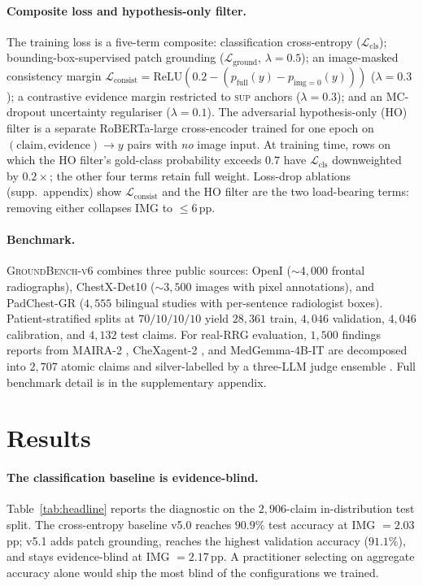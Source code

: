 \documentclass{article}
\begin{document}
\paragraph{Composite loss and hypothesis-only filter.} The training
loss is a five-term composite: classification cross-entropy
($\mathcal{L}_{\mathrm{cls}}$); bounding-box-supervised patch
grounding ($\mathcal{L}_{\mathrm{ground}}$, $\lambda = 0.5$); an
image-masked consistency margin
$\mathcal{L}_{\mathrm{consist}} = \mathrm{ReLU}(0.2 - (p_{\mathrm{full}}(y)
- p_{\mathrm{img}=0}(y)))$ ($\lambda = 0.3$); a contrastive evidence
margin restricted to \textsc{sup} anchors ($\lambda = 0.3$); and an
MC-dropout uncertainty regulariser ($\lambda = 0.1$). The adversarial
hypothesis-only (HO) filter is a separate RoBERTa-large cross-encoder
trained for one epoch on $(\text{claim}, \text{evidence}) \to y$
pairs with \emph{no} image input. At training time, rows on which
the HO filter's gold-class probability exceeds $0.7$ have
$\mathcal{L}_{\mathrm{cls}}$ downweighted by $0.2\times$; the other
four terms retain full weight. Loss-drop ablations
(supp.\ appendix) show $\mathcal{L}_{\mathrm{consist}}$
and the HO filter are the two load-bearing terms: removing either
collapses IMG to $\leq 6$\,pp.

\paragraph{Benchmark.} \textsc{GroundBench-v6} combines three public
sources: OpenI \citep{demner2016openi} ($\sim 4{,}000$ frontal
radiographs), ChestX-Det10 \citep{liu2020chestxdet} ($\sim 3{,}500$
images with pixel annotations), and PadChest-GR
\citep{castro2024padchestgr} ($4{,}555$ bilingual studies with
per-sentence radiologist boxes). Patient-stratified splits at
$70/10/10/10$ yield $28{,}361$ train, $4{,}046$ validation,
$4{,}046$ calibration, and $4{,}132$ test claims. For real-RRG
evaluation, $1{,}500$ findings reports from MAIRA-2
\citep{bannur2024maira2}, CheXagent-2 \citep{chen2024chexagent}, and
MedGemma-4B-IT \citep{google2024medgemma} are decomposed into
$2{,}707$ atomic claims and silver-labelled by a three-LLM judge
ensemble \citep{ostmeier2024green}. Full benchmark detail is in
the supplementary appendix.

\section{Results}
\label{sec:results}

\paragraph{The classification baseline is evidence-blind.}
Table~\ref{tab:headline} reports the diagnostic on the
$2{,}906$-claim in-distribution test split. The cross-entropy
baseline v5.0 reaches $90.9\%$ test accuracy at IMG $= 2.03$\,pp;
v5.1 adds patch grounding, reaches the highest validation accuracy
($91.1\%$), and stays evidence-blind at IMG $= 2.17$\,pp. A
practitioner selecting on aggregate accuracy alone would ship the
most blind of the configurations we trained.
\end{document}
